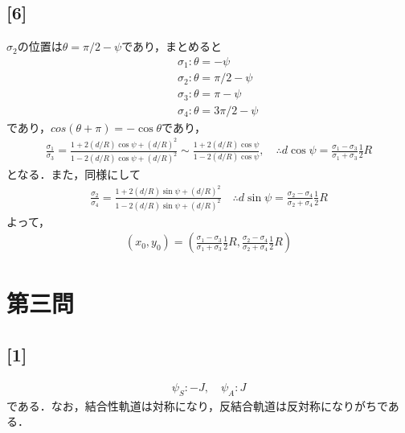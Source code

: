 \documentclass[12pt,dvipdfmx]{jsarticle}
\begin{document}
\subsection*{\large{[6]}}
$\sigma_2$の位置は$\theta=\pi/2-\psi$であり，まとめると
\begin{eqnarray}
  &&\sigma_1 : \theta=-\psi\\
  &&\sigma_2 : \theta=\pi/2-\psi\\
  &&\sigma_3 : \theta=\pi-\psi\\
  &&\sigma_4 : \theta=3\pi/2-\psi
\end{eqnarray}
であり，$cos(\theta+\pi)=-\cos\theta$であり，
\begin{eqnarray}
  \frac{\sigma_1}{\sigma_3} = \frac{1+2(d/R)\cos\psi + (d/R)^2}{1-2(d/R)\cos\psi + (d/R)^2} \sim \frac{1+2(d/R)\cos\psi}{1-2(d/R)\cos\psi},\quad\therefore d\cos\psi= \frac{\sigma_1-\sigma_3}{\sigma_1+\sigma_3}\frac{1}{2}R
\end{eqnarray}
となる．また，同様にして
\begin{eqnarray}
  \frac{\sigma_2}{\sigma_4} = \frac{1+2(d/R)\sin\psi + (d/R)^2}{1-2(d/R)\sin\psi + (d/R)^2}\quad\therefore d\sin\psi= \frac{\sigma_2-\sigma_4}{\sigma_2+\sigma_4}\frac{1}{2}R 
\end{eqnarray}
よって，
\begin{eqnarray}
  (x_0,y_0) = \left( \frac{\sigma_1-\sigma_3}{\sigma_1+\sigma_3}\frac{1}{2}R, \frac{\sigma_2-\sigma_4}{\sigma_2+\sigma_4}\frac{1}{2}R  \right)
\end{eqnarray}
\newpage
\section*{\Large{第三問}}
\subsection*{\large{[1]}}
\begin{eqnarray}
  \psi_S: -J ,\quad \psi_A: J
\end{eqnarray}
である．なお，結合性軌道は対称になり，反結合軌道は反対称になりがちである．
\end{document}
